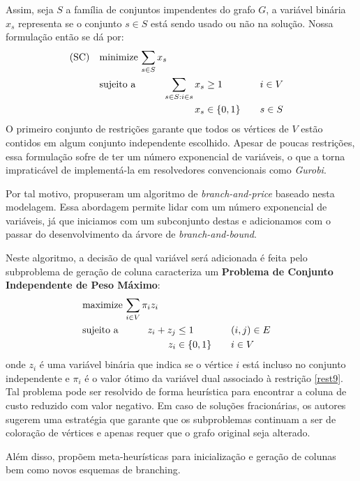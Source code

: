 \documentclass[11pt]{article}
\begin{document}
Assim, seja \(S\) a família de conjuntos impendentes do grafo \(G\), a variável binária \(x_s\) representa se o conjunto \(s \in S\) está sendo usado ou não na solução. Nossa formulação então se dá por:
\begin{alignat}{4}
\mathrm{(SC)} \quad & \omit\rlap{minimize  $\displaystyle \sum_{s \in S} x_s$} \nonumber \\
& \mbox{sujeito a}&& \quad & \sum_{s \in S: i \in s} x_{s}&\geq 1 & \quad & i \in V \label{rest9} \\
&                 &&   & x_s       & \in \{0,1\} &    & s \in S \nonumber
\end{alignat}
O primeiro conjunto de restrições garante que todos os vértices de \(V\) estão contidos em algum conjunto independente escolhido.
Apesar de poucas restrições, essa formulação sofre de ter um número exponencial de variáveis, o que a torna impraticável de implementá-la em resolvedores convencionais como \emph{Gurobi}.

Por tal motivo, \textcite{Mehrotra1996ColumnGenerationApproach} propuseram um algoritmo de \emph{branch-and-price} baseado nesta modelagem.
Essa abordagem permite lidar com um número exponencial de variáveis, já que iniciamos com um subconjunto destas e adicionamos com o passar do desenvolvimento da árvore de \emph{branch-and-bound}.

Neste algoritmo, a decisão de qual variável será adicionada é feita pelo subproblema de geração de coluna caracteriza um \textbf{Problema de Conjunto Independente de Peso Máximo}:
\begin{alignat*}{4}
& \omit\rlap{maximize  $\displaystyle \sum_{i \in V} \pi_i z_i$} \\
& \mbox{sujeito a}&& \quad & z_i + z_j &\leq 1 & \quad & (i,j) \in E \\
&                 &&   & z_i       & \in \{0,1\} &    & i \in V
\end{alignat*}
onde \(z_i\) é uma variável binária que indica se o vértice \(i\) está incluso no conjunto independente e \(\pi_i\) é o valor ótimo da variável dual associado à restrição \eqref{rest9}.
Tal problema pode ser resolvido de forma heurística para encontrar a coluna de custo reduzido com valor negativo.
Em caso de soluções fracionárias, os autores sugerem uma estratégia que garante que os subproblemas continuam a ser de coloração de vértices e apenas requer que o grafo original seja alterado.

Além disso, \textcite{Malaguti2011ExactApproachVertex} propõem meta-heurísticas para inicialização e geração de colunas bem como novos esquemas de branching.
\end{document}
